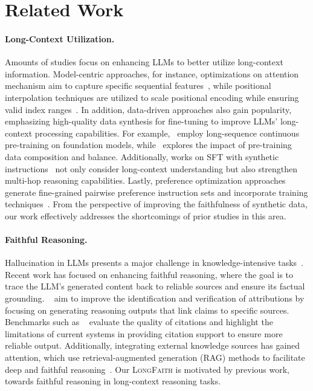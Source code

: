 \section{Related Work}
\label{sec:related}

\paragraph{Long-Context Utilization.} Amounts of studies focus on enhancing LLMs to better utilize long-context information. Model-centric approaches, for instance, optimizations on attention mechanism aim to capture specific sequential features~\cite{longformer, longnet, longlora, lminfinite}, while positional interpolation techniques are utilized to scale positional encoding while ensuring valid index ranges~\cite{pose, extending, longrope, yarn, longformer}. In addition, data-driven approaches also gain popularity, emphasizing high-quality data synthesis for fine-tuning to improve LLMs' long-context processing capabilities. For example,~\cite{effective, prolong} employ long-sequence continuous pre-training on foundation models, while~\cite{dataengineering} explores the impact of pre-training data composition and balance. Additionally, works on SFT with synthetic instructions~\cite{in2, longalign, coc, longmit} not only consider long-context understanding but also strengthen multi-hop reasoning capabilities. Lastly, preference optimization approaches~\cite{longreward, sealong} generate fine-grained pairwise preference instruction sets and incorporate training techniques~\cite{dpo, orpo}. From the perspective of improving the faithfulness of synthetic data, our work effectively addresses the shortcomings of prior studies in this area.

\paragraph{Faithful Reasoning.} Hallucination in LLMs presents a major challenge in knowledge-intensive tasks~\cite{siren, hallu}. Recent work has focused on enhancing faithful reasoning, where the goal is to trace the LLM's generated content back to reliable sources and ensure its factual grounding. ~\cite{cotar, attribution, coc} aim to improve the identification and verification of attributions by focusing on generating reasoning outputs that link claims to specific sources. Benchmarks such as ~\cite{alce, automatic} evaluate the quality of citations and highlight the limitations of current systems in providing citation support to ensure more reliable output. Additionally, integrating external knowledge sources has gained attention, which use retrieval-augmented generation (RAG) methods to facilitate deep and faithful reasoning~\cite{tog, tog2}. Our \textsc{LongFaith} is motivated by previous work, towards faithful reasoning in long-context reasoning tasks.